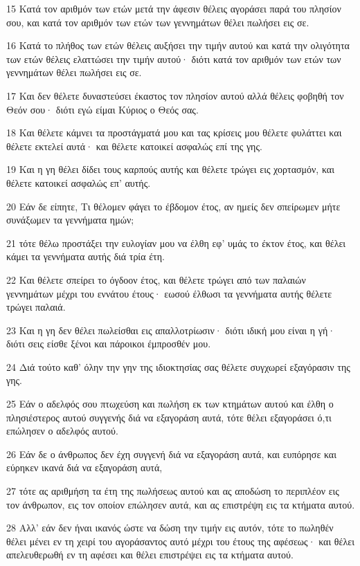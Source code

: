 \par 15 Κατά τον αριθμόν των ετών μετά την άφεσιν θέλεις αγοράσει παρά του πλησίον σου, και κατά τον αριθμόν των ετών των γεννημάτων θέλει πωλήσει εις σε.
\par 16 Κατά το πλήθος των ετών θέλεις αυξήσει την τιμήν αυτού και κατά την ολιγότητα των ετών θέλεις ελαττώσει την τιμήν αυτού· διότι κατά τον αριθμόν των ετών των γεννημάτων θέλει πωλήσει εις σε.
\par 17 Και δεν θέλετε δυναστεύσει έκαστος τον πλησίον αυτού αλλά θέλεις φοβηθή τον Θεόν σου· διότι εγώ είμαι Κύριος ο Θεός σας.
\par 18 Και θέλετε κάμνει τα προστάγματά μου και τας κρίσεις μου θέλετε φυλάττει και θέλετε εκτελεί αυτά· και θέλετε κατοικεί ασφαλώς επί της γης.
\par 19 Και η γη θέλει δίδει τους καρπούς αυτής και θέλετε τρώγει εις χορτασμόν, και θέλετε κατοικεί ασφαλώς επ' αυτής.
\par 20 Εάν δε είπητε, Τι θέλομεν φάγει το έβδομον έτος, αν ημείς δεν σπείρωμεν μήτε συνάξωμεν τα γεννήματα ημών;
\par 21 τότε θέλω προστάξει την ευλογίαν μου να έλθη εφ' υμάς το έκτον έτος, και θέλει κάμει τα γεννήματα αυτής διά τρία έτη.
\par 22 Και θέλετε σπείρει το όγδοον έτος, και θέλετε τρώγει από των παλαιών γεννημάτων μέχρι του εννάτου έτους· εωσού έλθωσι τα γεννήματα αυτής θέλετε τρώγει παλαιά.
\par 23 Και η γη δεν θέλει πωλείσθαι εις απαλλοτρίωσιν· διότι ιδική μου είναι η γή· διότι σεις είσθε ξένοι και πάροικοι έμπροσθέν μου.
\par 24 Διά τούτο καθ' όλην την γην της ιδιοκτησίας σας θέλετε συγχωρεί εξαγόρασιν της γης.
\par 25 Εάν ο αδελφός σου πτωχεύση και πωλήση εκ των κτημάτων αυτού και έλθη ο πλησιέστερος αυτού συγγενής διά να εξαγοράση αυτά, τότε θέλει εξαγοράσει ό,τι επώλησεν ο αδελφός αυτού.
\par 26 Εάν δε ο άνθρωπος δεν έχη συγγενή διά να εξαγοράση αυτά, και ευπόρησε και εύρηκεν ικανά διά να εξαγοράση αυτά,
\par 27 τότε ας αριθμήση τα έτη της πωλήσεως αυτού και ας αποδώση το περιπλέον εις τον άνθρωπον, εις τον οποίον επώλησεν αυτά, και ας επιστρέψη εις τα κτήματα αυτού.
\par 28 Αλλ' εάν δεν ήναι ικανός ώστε να δώση την τιμήν εις αυτόν, τότε το πωληθέν θέλει μένει εν τη χειρί του αγοράσαντος αυτό μέχρι του έτους της αφέσεως· και θέλει απελευθερωθή εν τη αφέσει και θέλει επιστρέψει εις τα κτήματα αυτού.
